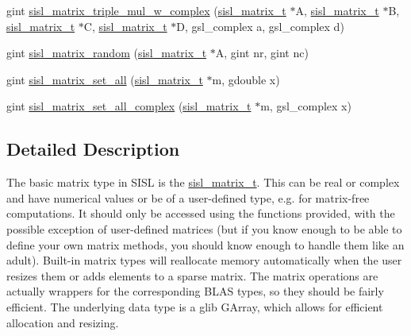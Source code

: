 \begin{DoxyCompactItemize}
\item 
gint \mbox{\hyperlink{group__matrix_gad8bb04946d2a31519333b75882bd1c53}{sisl\+\_\+matrix\+\_\+triple\+\_\+mul\+\_\+w\+\_\+complex}} (\mbox{\hyperlink{group__matrix_gad147923587b355644defb9bfbf981740}{sisl\+\_\+matrix\+\_\+t}} $\ast$A, \mbox{\hyperlink{group__matrix_gad147923587b355644defb9bfbf981740}{sisl\+\_\+matrix\+\_\+t}} $\ast$B, \mbox{\hyperlink{group__matrix_gad147923587b355644defb9bfbf981740}{sisl\+\_\+matrix\+\_\+t}} $\ast$C, \mbox{\hyperlink{group__matrix_gad147923587b355644defb9bfbf981740}{sisl\+\_\+matrix\+\_\+t}} $\ast$D, gsl\+\_\+complex a, gsl\+\_\+complex d)
\item 
gint \mbox{\hyperlink{group__matrix_ga19e36308f5f1faa18e4351aa8c8fc8ca}{sisl\+\_\+matrix\+\_\+random}} (\mbox{\hyperlink{group__matrix_gad147923587b355644defb9bfbf981740}{sisl\+\_\+matrix\+\_\+t}} $\ast$A, gint nr, gint nc)
\item 
gint \mbox{\hyperlink{group__matrix_ga66e250169138d9e41edbb5b899476635}{sisl\+\_\+matrix\+\_\+set\+\_\+all}} (\mbox{\hyperlink{group__matrix_gad147923587b355644defb9bfbf981740}{sisl\+\_\+matrix\+\_\+t}} $\ast$m, gdouble x)
\item 
gint \mbox{\hyperlink{group__matrix_ga171958e6d5574ffa91badb5ad38f8d4f}{sisl\+\_\+matrix\+\_\+set\+\_\+all\+\_\+complex}} (\mbox{\hyperlink{group__matrix_gad147923587b355644defb9bfbf981740}{sisl\+\_\+matrix\+\_\+t}} $\ast$m, gsl\+\_\+complex x)
\end{DoxyCompactItemize}


\subsection{Detailed Description}
The basic matrix type in S\+I\+SL is the \mbox{\hyperlink{group__matrix_gad147923587b355644defb9bfbf981740}{sisl\+\_\+matrix\+\_\+t}}. This can be real or complex and have numerical values or be of a user-\/defined type, e.\+g. for matrix-\/free computations. It should only be accessed using the functions provided, with the possible exception of user-\/defined matrices (but if you know enough to be able to define your own matrix methods, you should know enough to handle them like an adult). Built-\/in matrix types will reallocate memory automatically when the user resizes them or adds elements to a sparse matrix. The matrix operations are actually wrappers for the corresponding B\+L\+AS types, so they should be fairly efficient. The underlying data type is a glib G\+Array, which allows for efficient allocation and resizing. 

